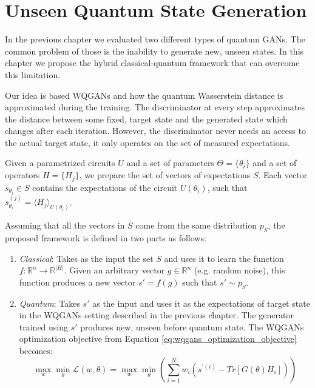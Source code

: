 \chapter{Unseen Quantum State Generation}
\label{chapter:my_contribution}
In the previous chapter we evaluated two different types of quantum GANs. The
common problem of those is the inability to generate new, unseen states. In this
chapter we propose the hybrid classical-quantum framework that can overcome this limitation. 

Our idea is based WQGANs and how the quantum Wasserstein distance is
approximated during the training. The discriminator at every step approximates
the distance between some fixed, target state and the generated state which
changes after each iteration. However, the discriminator never needs an access to
the actual target state, it only operates on the set of measured
expectations. 

Given a parametrized circuits $U$
and a set of parameters $\Theta = \{\theta_i\}$ and a set of operators $H =
\{H_j\}$, we prepare the set of vectors of expectations $S$. Each vector $s_{\theta_i}
\in S$ contains the expectations of the circuit $U(\theta_i)$, such that
$s_{\theta_i}^{(j)} = \langle H_j \rangle_{U(\theta_i)} $.

Assuming that all the vectors in $S$ come from the same distribution $p_S$,
the proposed framework is defined in two parts as follows:
\begin{enumerate}
\item \textit{Classical}: Takes as the input the set $S$ and uses it to learn the function $f:
  \mathbb{R}^{n} \to \mathbb{R}^{|H|}$. Given an arbitrary vector $g \in
  \mathbb{R}^n$ (e.g. random noise), this function produces a new vector $s' =
  f(g)$ such that $s' \sim p_S$.  
\item \textit{Quantum}: Takes $s'$ as the input and uses it as
  the expectations of target state in the WQGANs setting described in the
  previous chapter. The generator trained using $s'$ produces new, unseen before
  quantum state. The WQGANs optimization objective from Equation
  \eqref{eq:wqgans_optimization_objective} becomes:
  \begin{equation}
    \max_{w}{\min_{\theta}{\mathcal{L}(w, \theta)}} = \max_{w}{\min_{\theta}{(\sum_{i=1}^Nw_i(s^{\prime(i)} - Tr[G(\theta)H_i]))}} 
    \label{eq:wqgans_optimization_objective_unseen}
  \end{equation}
\end{enumerate}

